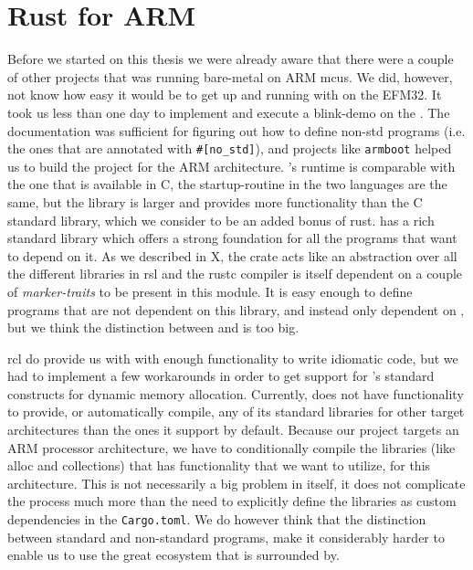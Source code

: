 
\section{Rust for ARM} %
\label{sec:rust_for_arm}

Before we started on this thesis we were already aware that there were a couple of other projects that was running {\rust} bare-metal on ARM \glspl{mcu}.
We did, however, not know how easy it would be to get up and running with {\rust} on the EFM32.
It took us less than one day to implement and execute a {\rust} blink-demo on the {\STK}.
The {\rust} documentation was sufficient for figuring out how to define non-std {\rust} programs (i.e. the ones that are annotated with \texttt{\#[no\_std]}), and projects like \texttt{armboot} helped us to build the project for the ARM architecture.
{\rust}'s runtime is comparable with the one that is available in C, the startup-routine in the two languages are the same, but the {\core} library is larger and provides more functionality than the C standard library, which we consider to be an added bonus of rust.
{\rust} has a rich standard library which offers a strong foundation for all the programs that want to depend on it.
As we described in X, the {\std} crate acts like an abstraction over all the different libraries in \gls{rsl} and the rustc compiler is itself dependent on a couple of \emph{marker-traits} to be present in this module.
It is easy enough to define programs that are not dependent on this {\std} library, and instead only dependent on {\core}, but we think the distinction between {\std} and {\core} is too big.

\gls{rcl} do provide us with with enough functionality to write idiomatic {\rust} code, but we had to implement a few workarounds in order to get support for {\rust}'s standard constructs for dynamic memory allocation.
Currently, {\rust} does not have functionality to provide, or automatically compile, any of its standard libraries for other target architectures than the ones it support by default.
Because our project targets an ARM processor architecture, we have to conditionally compile the libraries (like alloc and collections) that has functionality that we want to utilize, for this architecture.
This is not necessarily a big problem in itself, it does not complicate the process much more than the need to explicitly define the libraries as custom dependencies in the \texttt{Cargo.toml}.
We do however think that the distinction between standard and non-standard programs, make it considerably harder to enable us to use the great ecosystem that {\rust} is surrounded by.

